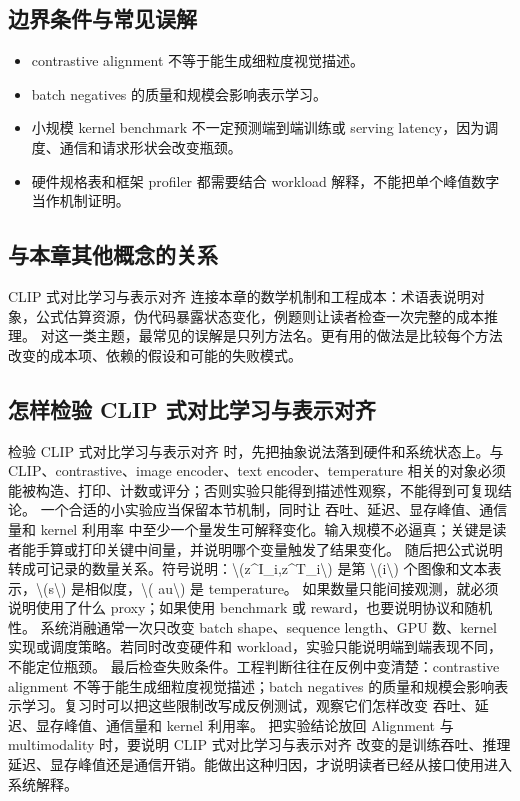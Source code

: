 \documentclass[a4paper]{article}
\begin{document}
\subsection{边界条件与常见误解}
\begin{itemize}
\item contrastive alignment 不等于能生成细粒度视觉描述。
\item batch negatives 的质量和规模会影响表示学习。
\item 小规模 kernel benchmark 不一定预测端到端训练或 serving latency，因为调度、通信和请求形状会改变瓶颈。
\item 硬件规格表和框架 profiler 都需要结合 workload 解释，不能把单个峰值数字当作机制证明。
\end{itemize}
\subsection{与本章其他概念的关系}
CLIP 式对比学习与表示对齐 连接本章的数学机制和工程成本：术语表说明对象，公式估算资源，伪代码暴露状态变化，例题则让读者检查一次完整的成本推理。
对这一类主题，最常见的误解是只列方法名。更有用的做法是比较每个方法改变的成本项、依赖的假设和可能的失败模式。
\subsection{怎样检验 CLIP 式对比学习与表示对齐}
检验 CLIP 式对比学习与表示对齐 时，先把抽象说法落到硬件和系统状态上。与 CLIP、contrastive、image encoder、text encoder、temperature 相关的对象必须能被构造、打印、计数或评分；否则实验只能得到描述性观察，不能得到可复现结论。
一个合适的小实验应当保留本节机制，同时让 吞吐、延迟、显存峰值、通信量和 kernel 利用率 中至少一个量发生可解释变化。输入规模不必逼真；关键是读者能手算或打印关键中间量，并说明哪个变量触发了结果变化。
随后把公式说明转成可记录的数量关系。符号说明：\textbackslash{}(z\textasciicircum{}I\_i,z\textasciicircum{}T\_i\textbackslash{}) 是第 \textbackslash{}(i\textbackslash{}) 个图像和文本表示，\textbackslash{}(s\textbackslash{}) 是相似度，\textbackslash{}( au\textbackslash{}) 是 temperature。 如果数量只能间接观测，就必须说明使用了什么 proxy；如果使用 benchmark 或 reward，也要说明协议和随机性。
系统消融通常一次只改变 batch shape、sequence length、GPU 数、kernel 实现或调度策略。若同时改变硬件和 workload，实验只能说明端到端表现不同，不能定位瓶颈。
最后检查失败条件。工程判断往往在反例中变清楚：contrastive alignment 不等于能生成细粒度视觉描述；batch negatives 的质量和规模会影响表示学习。复习时可以把这些限制改写成反例测试，观察它们怎样改变 吞吐、延迟、显存峰值、通信量和 kernel 利用率。
把实验结论放回 Alignment 与 multimodality 时，要说明 CLIP 式对比学习与表示对齐 改变的是训练吞吐、推理延迟、显存峰值还是通信开销。能做出这种归因，才说明读者已经从接口使用进入系统解释。
\end{document}
